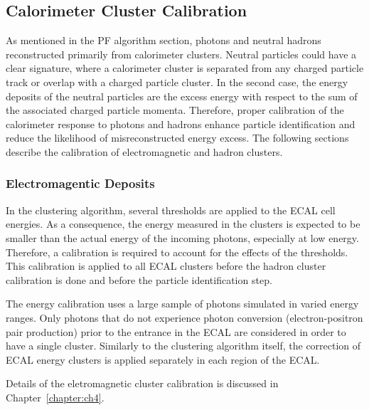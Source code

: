 \subsection{Calorimeter Cluster Calibration}
\label{subsec:calibration}
As mentioned in the PF algorithm section, photons and neutral hadrons reconstructed primarily from calorimeter clusters.
Neutral particles could have a clear signature, where a calorimeter cluster is separated from any charged particle track or overlap with a charged particle cluster.
In the second case, the energy deposits of the neutral particles are the excess energy with respect to the sum of the associated charged particle momenta.
Therefore, proper calibration of the calorimeter response to photons and hadrons enhance particle identification and reduce the likelihood of misreconstructed energy excess.
The following sections describe the calibration of electromagnetic and hadron clusters.

\subsubsection{Electromagentic Deposits}
In the clustering algorithm, several thresholds are applied to the ECAL cell energies. %
As a consequence, the energy measured in the clusters is expected to be smaller than the actual energy of the incoming photons, especially at low energy.
Therefore, a calibration is required to account for the effects of the thresholds. %
This calibration is applied to all ECAL clusters before the hadron cluster calibration is done and before the particle identification step.

The energy calibration uses a large sample of photons simulated in varied energy ranges.
Only photons that do not experience photon conversion (electron-positron pair production) prior to the entrance in the ECAL are considered in order to have a single cluster.
Similarly to the clustering algorithm itself, the correction of ECAL energy clusters is applied separately in each region of the ECAL.

Details of the eletromagnetic cluster calibration is discussed in Chapter~\ref{chapter:ch4}.


